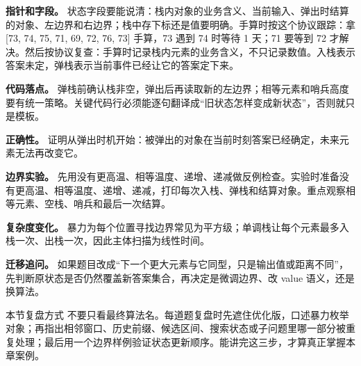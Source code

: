 \textbf{指针和字段。} 状态字段要能说清：栈内对象的业务含义、当前输入、弹出时结算的对象、左边界和右边界；栈中存下标还是值要明确。手算时按这个协议跟踪：拿 [73, 74, 75, 71, 69, 72, 76, 73] 手算，73 遇到 74 时等待 1 天；71 要等到 72 才解决。然后按协议复查：手算时记录栈内元素的业务含义，不只记录数值。入栈表示答案未定，弹栈表示当前事件已经让它的答案定下来。

\textbf{代码落点。} 弹栈前确认栈非空，弹出后再读取新的左边界；相等元素和哨兵高度要有统一策略。关键代码行必须能逐句翻译成“旧状态怎样变成新状态”，否则就只是模板。

\textbf{正确性。} 证明从弹出时机开始：被弹出的对象在当前时刻答案已经确定，未来元素无法再改变它。

\textbf{边界实验。} 先用没有更高温、相等温度、递增、递减做反例检查。实验时准备没有更高温、相等温度、递增、递减，打印每次入栈、弹栈和结算对象。重点观察相等元素、空栈、哨兵和最后一次结算。

\textbf{复杂度变化。} 暴力为每个位置寻找边界常见为平方级；单调栈让每个元素最多入栈一次、出栈一次，因此主体扫描为线性时间。

\textbf{迁移追问。} 如果题目改成“下一个更大元素与它同型，只是输出值或距离不同”，先判断原状态是否仍然覆盖新答案集合，再决定是微调边界、改 value 语义，还是换算法。

\begin{principlebox}{本节复盘方式}
不要只看最终算法名。每道题复盘时先遮住优化版，口述暴力枚举对象；再指出相邻窗口、历史前缀、候选区间、搜索状态或子问题里哪一部分被重复处理；最后用一个边界样例验证状态更新顺序。能讲完这三步，才算真正掌握本章案例。
\end{principlebox}
